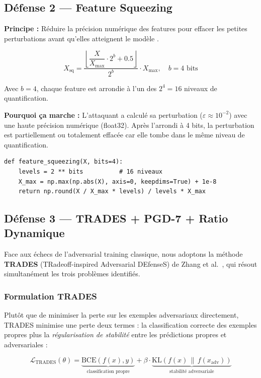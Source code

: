 \documentclass[11pt,a4paper]{article}
\begin{document}
\subsection{D\'efense 2 --- Feature Squeezing}

\textbf{Principe :} R\'eduire la pr\'ecision num\'erique des features pour effacer les petites
perturbations avant qu'elles atteignent le mod\`ele \cite{xu2018}.

\[
X_{\text{sq}} = \frac{\left\lfloor \dfrac{X}{X_{\max}} \cdot 2^b + 0.5 \right\rfloor}{2^b} \cdot X_{\max},
\quad b = 4 \text{ bits}
\]

Avec $b=4$, chaque feature est arrondie \`a l'un des $2^4 = 16$ niveaux de quantification.

\textbf{Pourquoi \c{c}a marche :} L'attaquant a calcul\'e sa perturbation ($\varepsilon \approx 10^{-2}$)
avec une haute pr\'ecision num\'erique (float32). Apr\`es l'arrondi \`a 4 bits, la perturbation est
partiellement ou totalement effac\'ee car elle tombe dans le m\^eme niveau de quantification.

\begin{lstlisting}[caption={Impl\'ementation du Feature Squeezing}]
def feature_squeezing(X, bits=4):
    levels = 2 ** bits          # 16 niveaux
    X_max = np.max(np.abs(X), axis=0, keepdims=True) + 1e-8
    return np.round(X / X_max * levels) / levels * X_max
\end{lstlisting}

\subsection{D\'efense 3 --- TRADES + PGD-7 + Ratio Dynamique}

Face aux \'echecs de l'adversarial training classique, nous adoptons la m\'ethode \textbf{TRADES}
(TRadeoff-inspired Adversarial DEfenseS) de Zhang et al.~\cite{zhang2019trades},
qui r\'esout simultan\'ement les trois probl\`emes identifi\'es.

\subsubsection*{Formulation TRADES}

Plut\^ot que de minimiser la perte sur les exemples adversariaux directement, TRADES minimise une
perte deux termes : la classification correcte des exemples propres plus la \emph{r\'egularisation
de stabilit\'e} entre les pr\'edictions propres et adversariales :

\[
\mathcal{L}_{\text{TRADES}}(\theta) = \underbrace{\text{BCE}(f(x), y)}_{\text{classification propre}}
+ \beta \cdot \underbrace{\text{KL}\!\left(f(x) \,\|\, f(x_{\text{adv}})\right)}_{\text{stabilit\'e adversariale}}
\]
\end{document}

